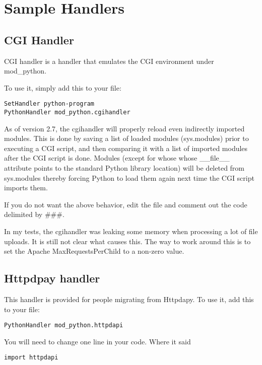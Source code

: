 \chapter{Sample Handlers\label{handlers}}

\section{CGI Handler\label{hand-cgi}}

CGI handler is a handler that emulates the CGI environment under mod_python. 

To use it, simply add this to your  file: 

\begin{verbatim}
SetHandler python-program
PythonHandler mod_python.cgihandler
\end{verbatim}

As of version 2.7, the cgihandler will properly reload even indirectly
imported modules. This is done by saving a list of loaded modules
(sys.modules) prior to executing a CGI script, and then comparing it
with a list of imported modules after the CGI script is done.  Modules
(except for whose whose __file__ attribute points to the standard
Python library location) will be deleted from sys.modules thereby
forcing Python to load them again next time the CGI script imports
them.

If you do not want the above behavior, edit the 
file and comment out the code delimited by \#\#\#.

In my tests, the cgihandler was leaking some memory when processing a
lot of file uploads. It is still not clear what causes this. The way
to work around this is to set the Apache MaxRequestsPerChild to a
non-zero value.

\section{Httpdpay handler\label{hand-httpdapy}}

This handler is provided for people migrating from Httpdapy. To use
it, add this to your  file:

\begin{verbatim}
PythonHandler mod_python.httpdapi
\end{verbatim}

You will need to change one line in your code. Where it said

\begin{verbatim}
import httpdapi
\end{verbatim}


